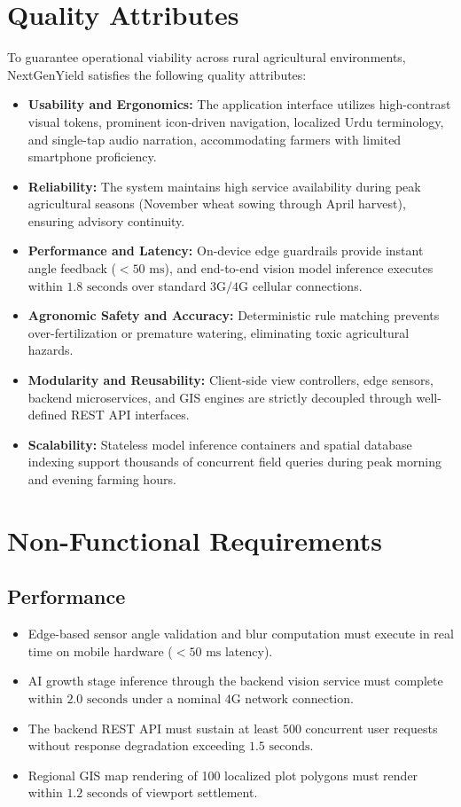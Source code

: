 \section{Quality Attributes}
To guarantee operational viability across rural agricultural environments, NextGenYield satisfies the following quality attributes:
\begin{itemize}
    \item \textbf{Usability and Ergonomics:} The application interface utilizes high-contrast visual tokens, prominent icon-driven navigation, localized Urdu terminology, and single-tap audio narration, accommodating farmers with limited smartphone proficiency.
    \item \textbf{Reliability:} The system maintains high service availability during peak agricultural seasons (November wheat sowing through April harvest), ensuring advisory continuity.
    \item \textbf{Performance and Latency:} On-device edge guardrails provide instant angle feedback ($< 50\text{ ms}$), and end-to-end vision model inference executes within $1.8\text{ seconds}$ over standard $3\text{G}/4\text{G}$ cellular connections.
    \item \textbf{Agronomic Safety and Accuracy:} Deterministic rule matching prevents over-fertilization or premature watering, eliminating toxic agricultural hazards.
    \item \textbf{Modularity and Reusability:} Client-side view controllers, edge sensors, backend microservices, and GIS engines are strictly decoupled through well-defined REST API interfaces.
    \item \textbf{Scalability:} Stateless model inference containers and spatial database indexing support thousands of concurrent field queries during peak morning and evening farming hours.
\end{itemize}

\section{Non-Functional Requirements}

\subsection{Performance}
\begin{itemize}
    \item Edge-based sensor angle validation and blur computation must execute in real time on mobile hardware ($< 50\text{ ms}$ latency).
    \item AI growth stage inference through the backend vision service must complete within $2.0\text{ seconds}$ under a nominal $4\text{G}$ network connection.
    \item The backend REST API must sustain at least $500$ concurrent user requests without response degradation exceeding $1.5\text{ seconds}$.
    \item Regional GIS map rendering of 100 localized plot polygons must render within $1.2\text{ seconds}$ of viewport settlement.
\end{itemize}

